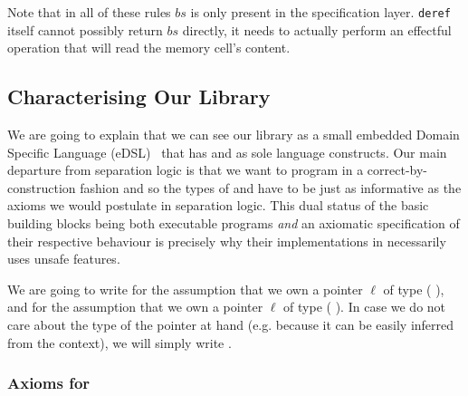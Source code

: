 Note that in all of these rules $\mathit{bs}$ is only present
in the specification layer. \texttt{deref} itself cannot possibly
return $\mathit{bs}$ directly, it needs to actually perform an
effectful operation that will read the memory cell's content.

\subsection{Characterising Our Library}

We are going to explain that we can see our library as a small
embedded Domain Specific
Language (eDSL)~\cite{DBLP:journals/csur/Hudak96}
that has  and  as
sole language constructs.
%
Our main departure from separation logic is that we want to
program in a correct-by-construction fashion and so the types
of  and  have to be
just as informative as the axioms we would postulate
in separation logic.
%
This dual status of the basic building blocks being both
executable programs \emph{and} an axiomatic specification
of their respective behaviour is precisely why their
implementations in \idris{} necessarily uses unsafe features.

We are going to write  for the assumption
that we own a pointer $\ell$ of type
(   ),
and  for the assumption that we own
a pointer $\ell$ of type (  ).
%
In case we do not care about the type of the pointer at hand
(e.g. because it can be easily inferred from the context), we
will simply write .


\subsubsection{Axioms for }\label{sec:axiom-poke}

